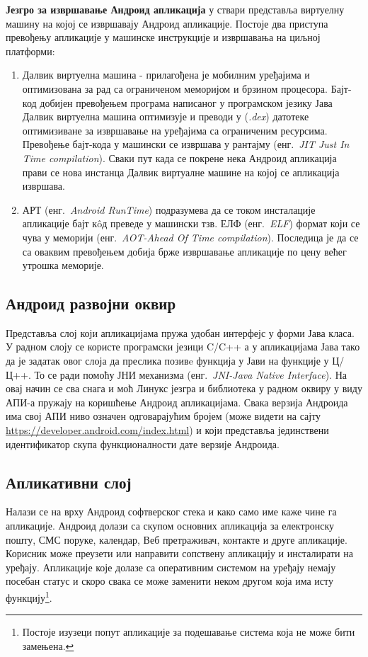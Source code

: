 \documentclass[12pt,oneside]{memoir}
\theoremstyle{remark}
\begin{document}
\textbf{Језгро за извршавање Андроид апликација} у ствари представља виртуелну машину на којој се извршавају Андроид апликације. Постоје два приступа превођењу апликације у машинске инструкције и извршавања на циљној платформи:
\begin{enumerate}
\item Далвик виртуелна машина - прилагођена је мобилним уређајима и оптимизована за рад са ограниченом меморијом и брзином процесора. Бајт-код добијен превођењем програма написаног у програмском језику Јава Далвик виртуелна машина оптимизује и преводи у  ({\em *.dex}) датотеке оптимизиване за извршавање на уређајима са ограниченим ресурсима. Превођење бајт-кода у машински се извршава у рантајму  (енг.~{\em JIT Just In Time compilation}). Сваки пут када се покрене нека Андроид апликација прави се нова инстанца Далвик виртуалне машине на којој се апликација извршава.
\item АРТ  (енг.~{\em Android RunTime}) подразумева да се током инсталације апликације бајт к\^{o}д преведе у машински тзв. ЕЛФ  (енг.~{\em ELF}) формат који се чува у меморији  (енг.~{\em AOT-Ahead Of Time compilation}). Последица је да се са оваквим превођењем добија брже извршавање апликације по цену већег утрошка меморије.
\end{enumerate}

\subsection{Андроид развојни оквир}
Представља слој који апликацијама пружа удобан интерфејс у форми Јава класа. У радном слоју се користе програмски језици C/C++ а у апликацијама Јава тако да је задатак овог слоја да преслика позивe функција у Јави на функције у Ц/Ц++. То се ради помоћу ЈНИ механизма (енг.~{\em JNI-Java Native Interface}). На овај начин се сва снага и моћ Линукс језгра и библиотека у радном оквиру у виду АПИ-а пружају на коришћење Андроид апликацијама. Свака верзија Андроида има свој АПИ ниво означен одговарајућим бројем (може видети на сајту \url{https://developer.android.com/index.html}) и који представља јединствени идентификатор скупа функционалности дате верзије Андроида.

\subsection{Апликативни слој}
Налази се на врху Андроид софтверског стека и како само име каже чине га апликације. Андроид долази са скупом основних апликација за електронску пошту, СМС поруке, календар, Веб претраживач, контакте и друге апликације. Корисник може преузети или направити сопствену апликацију и инсталирати на уређају. Апликације које долазе са оперативним системом на уређају немају посебан статус и скоро свака се може заменити неком другом која има исту функцију\footnote{Постоје изузеци попут апликације за подешавање система која не може бити замењена.}.
\end{document}
